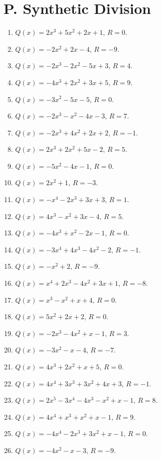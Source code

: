 \documentclass[11pt,oneside]{book}
\begin{document}
\section*{P. Synthetic Division}
\begin{enumerate}[leftmargin=*,label=\textbf{P\arabic*.},itemsep=0.45\baselineskip]
\item $Q(x)=2 x^{3} + 5 x^{2} + 2 x + 1$, $R=0$.
\item $Q(x)=- 2 x^{2} + 2 x - 4$, $R=-9$.
\item $Q(x)=- 2 x^{3} - 2 x^{2} - 5 x + 3$, $R=4$.
\item $Q(x)=- 4 x^{3} + 2 x^{2} + 3 x + 5$, $R=9$.
\item $Q(x)=- 3 x^{2} - 5 x - 5$, $R=0$.
\item $Q(x)=- 2 x^{3} - x^{2} - 4 x - 3$, $R=7$.
\item $Q(x)=- 2 x^{3} + 4 x^{2} + 2 x + 2$, $R=-1$.
\item $Q(x)=2 x^{3} + 2 x^{2} + 5 x - 2$, $R=5$.
\item $Q(x)=- 5 x^{2} - 4 x - 1$, $R=0$.
\item $Q(x)=2 x^{2} + 1$, $R=-3$.
\item $Q(x)=- x^{4} - 2 x^{3} + 3 x + 3$, $R=1$.
\item $Q(x)=4 x^{3} - x^{2} + 3 x - 4$, $R=5$.
\item $Q(x)=- 4 x^{3} + x^{2} - 2 x - 1$, $R=0$.
\item $Q(x)=- 3 x^{4} + 4 x^{3} - 4 x^{2} - 2$, $R=-1$.
\item $Q(x)=- x^{2} + 2$, $R=-9$.
\item $Q(x)=x^{4} + 2 x^{3} - 4 x^{2} + 3 x + 1$, $R=-8$.
\item $Q(x)=x^{3} - x^{2} + x + 4$, $R=0$.
\item $Q(x)=5 x^{2} + 2 x + 2$, $R=0$.
\item $Q(x)=- 2 x^{3} - 4 x^{2} + x - 1$, $R=3$.
\item $Q(x)=- 3 x^{2} - x - 4$, $R=-7$.
\item $Q(x)=4 x^{3} + 2 x^{2} + x + 5$, $R=0$.
\item $Q(x)=4 x^{4} + 3 x^{3} + 3 x^{2} + 4 x + 3$, $R=-1$.
\item $Q(x)=2 x^{5} - 3 x^{4} - 4 x^{3} - x^{2} + x - 1$, $R=8$.
\item $Q(x)=4 x^{4} + x^{3} + x^{2} + x - 1$, $R=9$.
\item $Q(x)=- 4 x^{4} - 2 x^{3} + 3 x^{2} + x - 1$, $R=0$.
\item $Q(x)=- 4 x^{2} - x - 3$, $R=-9$.

\end{enumerate}
\end{document}
